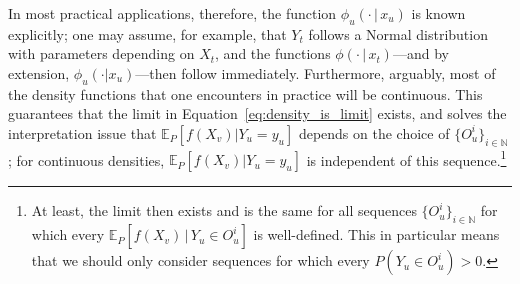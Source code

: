 \documentclass[twoside,11pt]{article}
\newcommand{\nats}{\mathbb{N}}
\newcommand{\states}{\mathcal{X}}
\newcommand{\observs}{\mathcal{Y}}
\newcommand{\lexp}{\underline{\mathbb{E}}_{\rateset,\mathcal{M}}}
\newcommand{\rateset}{\mathcal{Q}}
\begin{document}
In most practical applications, therefore, the function $\phi_u(\cdot\,\vert\,x_u)$ is known explicitly; one may assume, for example, that $Y_t$ follows a Normal distribution with parameters depending on $X_t$, and the functions $\phi(\cdot\,\vert\,x_t)$---and by extension, $\phi_u(\cdot\vert x_u)$---then follow immediately. Furthermore, arguably, most of the density functions that one encounters in practice will be continuous. This guarantees that the limit in Equation~\eqref{eq:density_is_limit} exists, and solves the interpretation issue that $\mathbb{E}_P[f(X_v)\vert Y_u=y_u]$ depends on the choice of $\{O_u^i\}_{i\in\nats}$; for continuous densities, $\mathbb{E}_P[f(X_v)\vert Y_u=y_u]$ is independent of this sequence.\footnote{\label{fnote:extra_condition}At least, the limit then exists and is the same for all sequences $\{O_u^i\}_{i\in\nats}$ for which every $\mathbb{E}_P[f(X_v)\,\vert\,Y_u\in O_u^i]$ is well-defined. This in particular means that we should only consider sequences for which every $P(Y_u\in O_u^i)>0$.}


\end{document}
